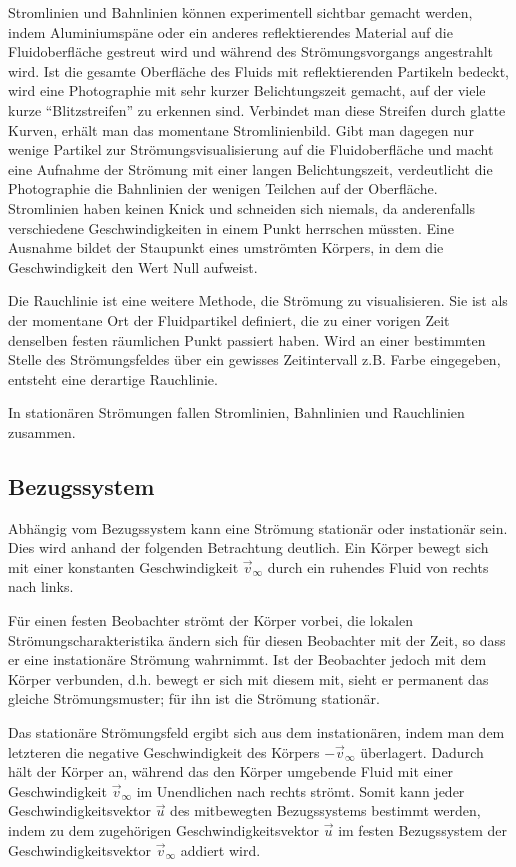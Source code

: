 \documentclass{lecture}
\begin{document}
    Stromlinien und Bahnlinien können experimentell sichtbar gemacht werden, indem Aluminiumspäne oder ein anderes reflektierendes Material auf die Fluidoberfläche gestreut wird und während des Strömungsvorgangs angestrahlt wird.
    Ist die gesamte Oberfläche des Fluids mit reflektierenden Partikeln bedeckt, wird eine Photographie mit sehr kurzer Belichtungszeit gemacht, auf der viele kurze ``Blitzstreifen'' zu erkennen sind.
    Verbindet man diese Streifen durch glatte Kurven, erhält man das momentane Stromlinienbild.
    Gibt man dagegen nur wenige Partikel zur Strömungsvisualisierung auf die Fluidoberfläche und macht eine Aufnahme der Strömung mit einer langen Belichtungszeit, verdeutlicht die Photographie die Bahnlinien der wenigen Teilchen auf der Oberfläche.
    Stromlinien haben keinen Knick und schneiden sich niemals, da anderenfalls verschiedene Geschwindigkeiten in einem Punkt herrschen müssten.
    Eine Ausnahme bildet der Staupunkt eines umströmten Körpers, in dem die Geschwindigkeit den Wert Null aufweist.

    Die Rauchlinie ist eine weitere Methode, die Strömung zu visualisieren.
    Sie ist als der momentane Ort der Fluidpartikel definiert, die zu einer vorigen Zeit denselben festen räumlichen Punkt passiert haben.
    Wird an einer bestimmten Stelle des Strömungsfeldes über ein gewisses Zeitintervall z.B. Farbe eingegeben, entsteht eine derartige Rauchlinie.

    In stationären Strömungen fallen Stromlinien, Bahnlinien und Rauchlinien zusammen.


    \subsection*{Bezugssystem}

    Abhängig vom Bezugssystem kann eine Strömung stationär oder instationär sein.
    Dies wird anhand der folgenden Betrachtung deutlich.
    Ein Körper bewegt sich mit einer konstanten Geschwindigkeit \(\vec{v}_\infty\) durch ein ruhendes Fluid von rechts nach links.

    Für einen festen Beobachter strömt der Körper vorbei, die lokalen Strömungscharakteristika ändern sich für diesen Beobachter mit der Zeit, so dass er eine instationäre Strömung wahrnimmt.
    Ist der Beobachter jedoch mit dem Körper verbunden, d.h. bewegt er sich mit diesem mit, sieht er permanent das gleiche Strömungsmuster; für ihn ist die Strömung stationär.

    Das stationäre Strömungsfeld ergibt sich aus dem instationären, indem man dem letzteren die negative Geschwindigkeit des Körpers \(-\vec{v}_\infty\) überlagert.
    Dadurch hält der Körper an, während das den Körper umgebende Fluid mit einer Geschwindigkeit \(\vec{v}_\infty\) im Unendlichen nach rechts strömt.
    Somit kann jeder Geschwindigkeitsvektor \(\vec{u}\) des mitbewegten Bezugssystems bestimmt werden, indem zu dem zugehörigen Geschwindigkeitsvektor \(\vec{u}\) im festen Bezugssystem der Geschwindigkeitsvektor \(\vec{v}_\infty\) addiert wird.
\end{document}

